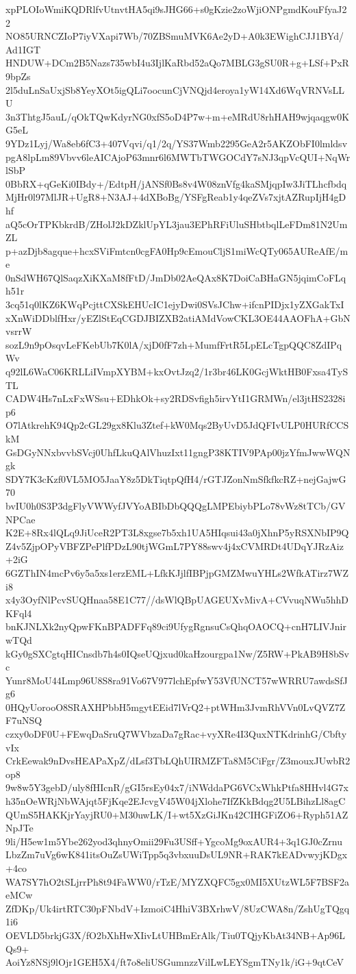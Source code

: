 xpPLOIoWmiKQDRlfvUtnvtHA5qi9sJHG66+s0gKzie2zoWjiONPgmdKouFfyaJ22
NO85URNCZIoP7iyVXapi7Wb/70ZBSmuMVK6Ae2yD+A0k3EWighCJJ1BYd/Ad1IGT
HNDUW+DCm2B5Nazs735wbI4u3IjlKaRbd52aQo7MBLG3gSU0R+g+LSf+PxR9bpZs
2l5duLnSaUxjSb8YeyXOt5igQLi7oocunCjVNQjd4eroya1yW14Xd6WqVRNVsLLU
3n3ThtgJ5auL/qOkTQwKdyrNG0xfS5oD4P7w+m+eMRdU8rhHAH9wjqaqgw0KG5eL
9YDz1Lyj/Wa8eb6fC3+407Vqvi/q1/2q/YS37Wmb2295GeA2r5AKZObFI0lmldsv
pgA8lpLm89Vbvv6leAICAjoP63mnr6l6MWTbTWGOCdY7sNJ3qpVcQUI+NqWrlSbP
0BbRX+qGeKi0IBdy+/EdtpH/jANSf0Bs8v4W08znVfg4kaSMjqpIw3JiTLhcfbdq
MjHr0l97MlJR+UgR8+N3AJ+4dXBoBg/YSFgReab1y4qeZVs7xjtAZRupIjH4gDhf
aQ5cOrTPKbkrdB/ZHolJ2kDZklUpYL3jau3EPhRFiUluSHbtbqlLeFDm81N2UmZL
p+azDjb8agque+hcxSViFmtcn0cgFA0Hp9cEmouCljS1miWcQTy065AUReAfE/me
0nSdWH67QlSaqzXiKXaM8fFtD/JmDb02AeQAx8K7DoiCaBHaGN5jqimCoFLqh51r
3cq51q0lKZ6KWqPcjttCXSkEHUcIC1ejyDwi0SVsJChw+ifcnPIDjx1yZXGakTxI
xXnWiDDblfHxr/yEZlStEqCGDJBIZXB2atiAMdVowCKL3OE44AAOFhA+GbNvsrrW
sozL9n9pOsqvLeFKebUb7K0lA/xjD0fF7zh+MumfFrtR5LpELcTgpQQC8ZdIPqWv
q92lL6WaC06KRLLiIVmpXYBM+kxOvtJzq2/1r3br46LK0GcjWktHB0Fxsa4TySTL
CADW4Hs7nLxFxWSsu+EDhkOk+sy2RDSvfigh5irvYtI1GRMWn/el3jtHS2328ip6
O7lAtkrehK94Qp2cGL29gx8Klu3Ztef+kW0Mqs2ByUvD5JdQFIvULP0HURfCCSkM
GsDGyNNxbvvbSVcj0UhfLkuQAlVhuzIxt11gngP38KTIV9PAp00jzYfmJwwWQNgk
SDY7K3cKzf0VL5MO5JaaY8z5DkTiqtpQfH4/rGTJZonNmSfkfkcRZ+nejGajwG70
bvIU0h0S3P3dgFlyVWWyfJVYoABIbDbQQQgLMPEbiybPLo78vWz8tTCb/GVNPCae
K2E+8Rx4lQLq9JiUceR2PT3L8xgse7b5xh1UA5HIqsui43a0jXhnP5yRSXNbIP9Q
Z4v5ZjpOPyVBFZPePlfPDzL90tjWGmL7PY88swv4j4xCVMRDt4UDqYJRzAiz+2iG
6GZThIN4mcPv6y5a5xs1erzEML+LfkKJjlfIBPjpGMZMwuYHLs2WfkATirz7WZi8
x4y3OyfNlPcvSUQHnaa58E1C77//dsWlQBpUAGEUXvMivA+CVvuqNWu5hhDKFql4
bnKJNLXk2nyQpwFKnBPADFFq89ci9UfygRgnsuCsQhqOAOCQ+cnH7LIVJnirwTQd
kGy0gSXCgtqHICnsdb7h4s0IQseUQjxud0kaHzourgpa1Nw/Z5RW+PkAB9H8bSvc
Yunr8MoU44Lmp96U8S8ra91Vo67V977lchEpfwY53VfUNCT57wWRRU7awdsSfJg6
0HQyUorooO8SRAXHPbbH5mgytEEid7lVrQ2+ptWHm3JvmRhVVn0LvQVZ7ZF7uNSQ
czxy0oDF0U+FEwqDaSruQ7WVbzaDa7gRac+vyXRe4I3QuxNTKdrinhG/CbftyvIx
CrkEewak9nDvsHEAPaXpZ/dLsf3TbLQhUIRMZFTa8M5CiFgr/Z3mouxJUwbR2op8
9w8w5Y3gebD/uly8fHIcnR/gGI5rsEy04x7/iNWddaPG6VCxWhkPtfa8HHvl4G7x
h35nOeWRjNbWAjqt5FjKqe2EJcvgV45W04jXlohe7IfZKkBdqg2U5LBihzLl8agC
QUmS5HAKKjrYayjRU0+M30uwLK/I+wt5XzGiJKn42CIHGFiZO6+Ryph51AZNpJTe
9li/H5ew1m5Ybe262yod3qhnyOmii29Fu3USff+YgcoMg9oxAUR4+3q1GJ0cZrnu
LbzZm7uVg6wK841itsOuZsUWiTpp5q3vbxuuDsUL9NR+RAK7kEADvwyjKDgx+4co
WA7SY7hO2tSLjrrPh8t94FaWW0/rTzE/MYZXQFC5gx0MI5XUtzWL5F7BSF2aeMCw
ZfDKp/Uk4irtRTC30pFNbdV+IzmoiC4HhiV3BXrhwV/8UzCWA8n/ZshUgTQgq1i6
OEVLD5brkjG3X/fO2bXhHwXIivLtUHBmErAlk/Tiu0TQjyKbAt34NB+Ap96LQs9+
AoiYz8NSj9lOjr1GEH5X4/ft7o8eliUSGumnzzVilLwLEYSgmTNy1k/iG+9qtCeV
